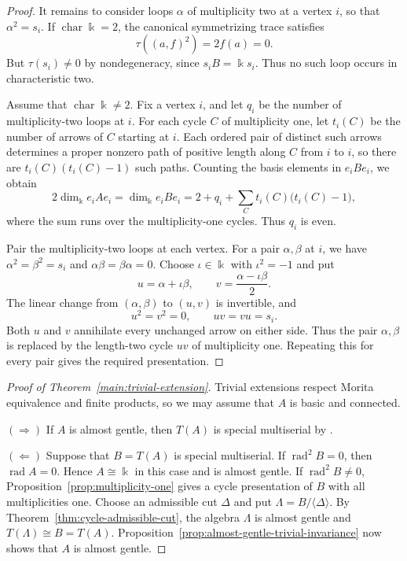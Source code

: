 \documentclass[11pt]{article}
\DeclareMathOperator{\rad}{rad}
\theoremstyle{definition}
\begin{document}
\begin{proof}
			It remains to consider loops $\alpha$ of multiplicity two at a vertex $i$, so that $\alpha^2=s_i$.
			If $\operatorname{char}\Bbbk=2$, the canonical symmetrizing trace satisfies
			\[
				\tau((a,f)^2)=2f(a)=0.
			\]
			But $\tau(s_i)\neq0$ by nondegeneracy, since $s_iB=\Bbbk s_i$.
			Thus no such loop occurs in characteristic two.

			Assume that $\operatorname{char}\Bbbk\neq2$.
			Fix a vertex $i$, and let $q_i$ be the number of multiplicity-two loops at $i$. For each cycle $C$ of multiplicity one, let $t_i(C)$ be the number of arrows of $C$ starting at $i$. Each ordered pair of distinct such arrows determines a proper nonzero path of positive length along $C$ from $i$ to $i$, so there are $t_i(C)(t_i(C)-1)$ such paths. Counting the basis elements in $e_iBe_i$, we obtain
			\[
				2\dim_\Bbbk e_iAe_i
				=\dim_\Bbbk e_iBe_i
				=2+q_i+\sum_C t_i(C)\bigl(t_i(C)-1\bigr),
			\]
			where the sum runs over the multiplicity-one cycles.
			Thus $q_i$ is even.

			Pair the multiplicity-two loops at each vertex.
			For a pair $\alpha,\beta$ at $i$, we have $\alpha^2=\beta^2=s_i$ and $\alpha\beta=\beta\alpha=0$.
			Choose $\iota\in\Bbbk$ with $\iota^2=-1$ and put
			\[
				u=\alpha+\iota\beta,\qquad
				v=\frac{\alpha-\iota\beta}{2}.
			\]
			The linear change from $(\alpha,\beta)$ to $(u,v)$ is invertible, and
			\[
				u^2=v^2=0,\qquad uv=vu=s_i.
			\]
			Both $u$ and $v$ annihilate every unchanged arrow on either side. Thus the pair $\alpha,\beta$ is replaced by the length-two cycle $uv$ of multiplicity one.
			Repeating this for every pair gives the required presentation.
		\end{proof}

		\smallskip
		\smallskip
		\begin{proof}[Proof of Theorem~\ref{main:trivial-extension}]
			Trivial extensions respect Morita equivalence and finite products, so we may assume that $A$ is basic and connected.

			\smallskip
			\noindent\underline{$(\Rightarrow)$}\quad
			If $A$ is almost gentle, then $T(A)$ is special multiserial by \cite[Corollary~4.4]{GreenSchrollAlmost}.

			\smallskip
			\noindent\underline{$(\Leftarrow)$}\quad
			Suppose that $B=T(A)$ is special multiserial. If $\rad^2B=0$, then $\rad A=0$. Hence $A\cong\Bbbk$ in this case and is almost gentle.
			If $\rad^2B\neq0$, Proposition~\ref{prop:multiplicity-one} gives a cycle presentation of $B$ with all multiplicities one.
			Choose an admissible cut $\Delta$ and put $\Lambda=B/\langle\Delta\rangle$.
			By Theorem~\ref{thm:cycle-admissible-cut}, the algebra $\Lambda$ is almost gentle and $T(\Lambda)\cong B=T(A)$.
			Proposition~\ref{prop:almost-gentle-trivial-invariance} now shows that $A$ is almost gentle.
		\end{proof}
\end{document}
